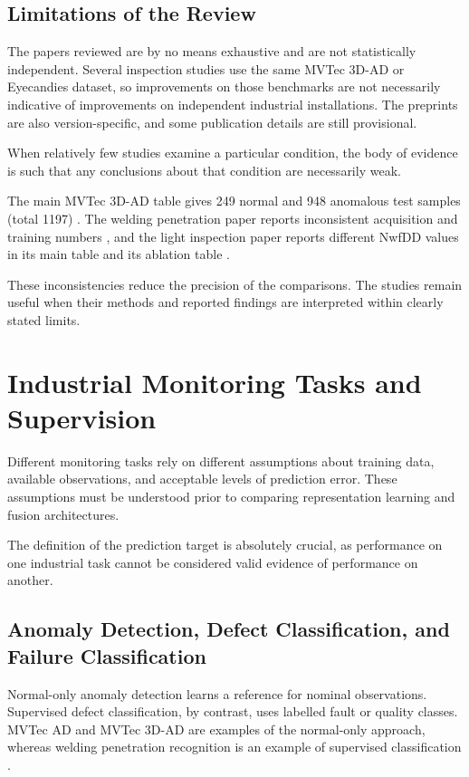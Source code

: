 \subsection{Limitations of the Review}

The papers reviewed are by no means exhaustive and are not statistically independent. Several
inspection studies use the same MVTec 3D-AD or Eyecandies dataset, so improvements on those
benchmarks are not necessarily indicative of improvements on independent industrial installations.
The preprints are also version-specific, and some publication details are still provisional.

When relatively few studies examine a particular condition, the body of evidence is such that any
conclusions about that condition are necessarily weak.

The main MVTec 3D-AD table gives 249 normal and 948 anomalous test samples (total 1197)
\parencite[Table~1]{bergmann_mvtec_2022}. The welding penetration paper reports inconsistent acquisition and
training numbers \parencite[pp.~6708, 6711]{hua_anti-interference_2026}, and the light inspection paper reports different NwfDD values in its main table
and its ablation table \parencite[Tables~IV, VI--VII]{zhang_combined_2024}.

These inconsistencies reduce the precision of the comparisons. The studies remain useful when their
methods and reported findings are interpreted within clearly stated limits.

\section{Industrial Monitoring Tasks and Supervision}

Different monitoring tasks rely on different assumptions about training data, available
observations, and acceptable levels of prediction error. These assumptions must be understood prior
to comparing representation learning and fusion architectures.

The definition of the prediction target is absolutely crucial, as performance on one industrial task
cannot be considered valid evidence of performance on another.

\subsection{Anomaly Detection, Defect Classification, and Failure Classification}

Normal-only anomaly detection learns a reference for nominal observations. Supervised defect
classification, by contrast, uses labelled fault or quality classes. MVTec AD and MVTec 3D-AD are
examples of the normal-only approach, whereas welding penetration recognition is an example of
supervised classification \parencite{bergmann_mvtec_2019,bergmann_mvtec_2022,hua_anti-interference_2026}.

